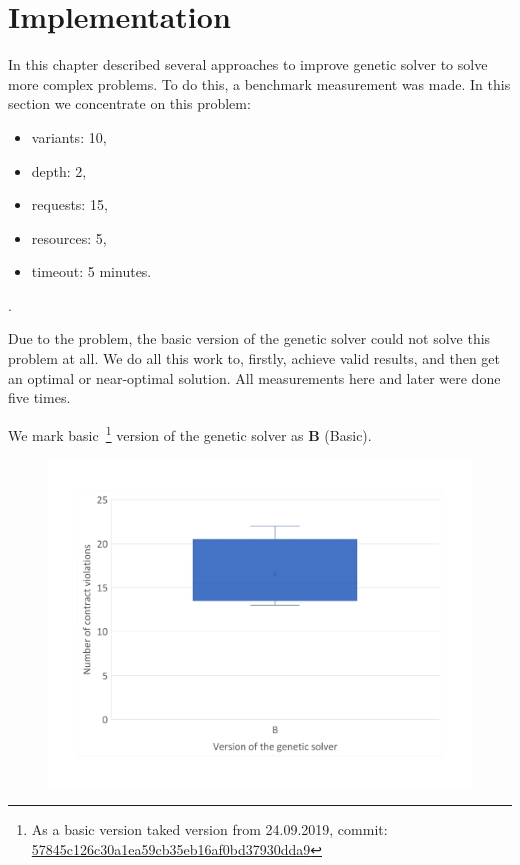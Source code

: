 \chapter{Implementation}\label{chapter:Implementation}

In this chapter described several approaches to improve genetic solver to solve more complex problems.
To do this, a benchmark measurement was made.
In this section we concentrate on this problem:

\begin{itemize}
	\item variants: 10,
	\item depth: 2,
	\item requests: 15,
	\item resources: 5,
	\item timeout: 5 minutes.
\end{itemize}.

Due to the problem, the basic version of the genetic solver could not solve this problem at all. We do all this work to, firstly, achieve valid results, and then get an optimal or near-optimal solution. 
All measurements here and later were done five times.


We mark basic~\footnote{As a basic version taked version from 24.09.2019, commit: \href{https://git-st.inf.tu-dresden.de/mquat/mquat2/commit/57845c126c30a1ea59cb35eb16af0bd37930dda9}{57845c126c30a1ea59cb35eb16af0bd37930dda9}} version of the genetic solver as \textbf{B} (Basic).


\begin{figure}[h]
	\centering
	\includegraphics[width=\textwidth]{images/BoxPlotSolverBasic}
	\caption[Boxplot with a number of contract violations for the basic version of genetic solver]{}
	\label{fig:boxplotsolverbasic}
\end{figure}



